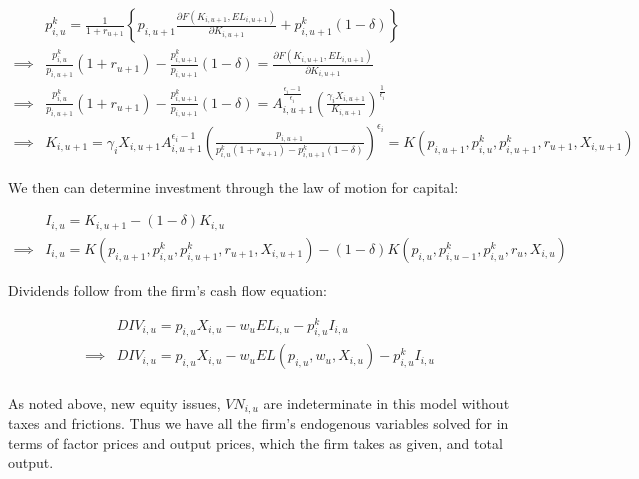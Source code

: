 \documentclass[letterpaper,12pt]{article}
\theoremstyle{definition}
\begin{document}
\begin{spacing}{1.5}
\begin{equation}
\label{eqn:solve_dyn_k}
\begin{split}
 &p^{k}_{i,u} =  \frac{1}{1+r_{u+1}} \left\{p_{i,u+1}\frac{\partial F(K_{i,u+1},EL_{i,u+1})}{\partial K_{i,u+1}}+ p^{k}_{i,u+1}(1-\delta)  \right\}  \\
 \implies & \frac{p^{k}_{i,u}}{p_{i,u+1}}(1+r_{u+1}) - \frac{p^{k}_{i,u+1}}{p_{i,u+1}}(1-\delta) =\frac{\partial F(K_{i,u+1},EL_{i,u+1})}{\partial K_{i,u+1}} \\
\implies & \frac{p^{k}_{i,u}}{p_{i,u+1}}(1+r_{u+1}) - \frac{p^{k}_{i,u+1}}{p_{i,u+1}}(1-\delta) =A_{i,u+1}^{\frac{\epsilon_{i}-1}{\epsilon_{i}}} \left( \frac{\gamma_{i}X_{i,u+1}}{K_{i,u+1}}\right)^{\frac{1}{\epsilon_{i}}} \\
\implies & K_{i,u+1} = \gamma_{i}X_{i,u+1}A_{i,u+1}^{\epsilon_{i}-1} \left(\frac{p_{i,u+1}}{p^{k}_{i,u}(1+r_{u+1}) - p^{k}_{i,u+1}(1-\delta)} \right)^{\epsilon_{i}} = K(p_{i,u+1},p^{k}_{i,u},p^{k}_{i,u+1},r_{u+1},X_{i,u+1})
\end{split}
\end{equation}

We then can determine investment through the law of motion for capital:

\begin{equation}
\label{eqn:solve_dyn_i}
\begin{split}
 &I_{i,u} = K_{i,u+1} - (1-\delta)K_{i,u} \\
\implies & I_{i,u} = K(p_{i,u+1},p^{k}_{i,u},p^{k}_{i,u+1},r_{u+1},X_{i,u+1}) - (1-\delta)K(p_{i,u},p^{k}_{i,u-1},p^{k}_{i,u},r_{u},X_{i,u}) 
\end{split}
\end{equation}

Dividends follow from the firm's cash flow equation:

\begin{equation}
\label{eqn:solve_dyn_div}
\begin{split}
 &DIV_{i,u} = p_{i,u}X_{i,u} - w_{u}EL_{i,u}-p^{k}_{i,u}I_{i,u} \\
\implies &DIV_{i,u} = p_{i,u}X_{i,u} - w_{u}EL(p_{i,u},w_{u},X_{i,u}) - p^{k}_{i,u}I_{i,u} \\
\end{split}
\end{equation}

As noted above, new equity issues, $VN_{i,u}$ are indeterminate in this model without taxes and frictions.  Thus we have all the firm's endogenous variables solved for in terms of factor prices and output prices, which the firm takes as given, and total output.


\end{spacing}
\end{document}

